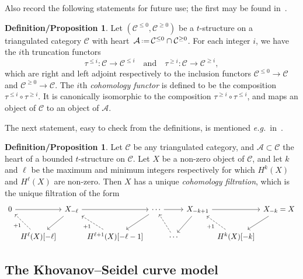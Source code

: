 \documentclass{amsart}
\theoremstyle{definition}
\newtheorem{defprop}[theorem]{Definition/Proposition}
\newcommand{\eqdef}{\mbox{\,\raisebox{0.2ex}{\scriptsize\ensuremath{\mathrm:}}\ensuremath{=}\,}} %
\newcommand{\eg}{\textit{e.g.}~} %
\newcommand{\darkblue}{\color{darkblue}} %
\newcommand{\defn}[1]{\textsl{\darkblue #1}} %
\begin{document}
Also record the following statements for future use; the first may be found in~\cite[Sect.~1.3]{bel.ber.del:82}.

\begin{defprop}
\label{defprop:cohomology}
Let \((\mathcal{C}^{\le 0}, \mathcal{C}^{\geq 0})\) be a \(t\)-structure on a triangulated category \(\mathcal{C}\) with heart~\(\mathcal{A} \eqdef \mathcal{C}^{\leq 0} \cap \mathcal{C}^{\geq 0}\).
For each integer \(i\), we have the \(i\)th truncation functors
\[
\tau^{\leq i} \colon \mathcal{C} \to \mathcal{C}^{\leq i} \quad\text{and}\quad \tau^{\geq i} \colon \mathcal{C} \to \mathcal{C}^{\geq i},
\]
which are right and left adjoint respectively to the inclusion functors \(\mathcal{C}^{\leq 0} \to \mathcal{C}\) and \(\mathcal{C}^{\geq 0} \to \mathcal{C}\).
The \(i\)th \defn{cohomology functor} is defined to be the composition \(\tau^{\leq i} \circ \tau^{\geq i}\).
It is canonically isomorphic to the composition \(\tau^{\geq i} \circ \tau^{\leq i}\), and maps an object of \(\mathcal{C}\) to an object of \(\mathcal{A}\).
\end{defprop}

The next statement, easy to check from the definitions, is mentioned \eg in~\cite[Sect.~3.3]{bayer2011tour}.

\begin{defprop}
\label{defprop:cohomology-filtration}
Let \(\mathcal{C}\) be any triangulated category, and \(\mathcal{A} \subset \mathcal{C}\) the heart of a bounded \(t\)-structure on \(\mathcal{C}\).
Let \(X\) be a non-zero object of \(\mathcal{C}\), and let \(k\) and \(\ell\) be the maximum and minimum integers respectively for which \(H^k(X)\) and \(H^\ell(X)\) are non-zero.
Then \(X\) has a unique \defn{cohomology filtration}, which is the unique filtration of the form
\[
\begin{tikzcd}[column sep=0.1cm]
	0  \arrow{rr} && X_{-\ell} \arrow{dl} \arrow{rr} && \cdots \arrow{rr} \arrow{dl} && X_{-k+1} \arrow{rr} \arrow{dl} && X_{-k} = X \arrow{dl}\\
	& H^\ell(X)[-\ell] \arrow[dashed]{ul}{+1} && H^{\ell+1}(X)[-\ell-1] \arrow[dashed]{ul}{+1} && \cdots \arrow[dashed]{ul} &&H^k(X)[-k] \arrow[dashed]{ul}{+1}
\end{tikzcd}
\]  
\end{defprop}


\subsection{The Khovanov--Seidel curve model}
\label{subsec:KSCurveModel}
\end{document}
